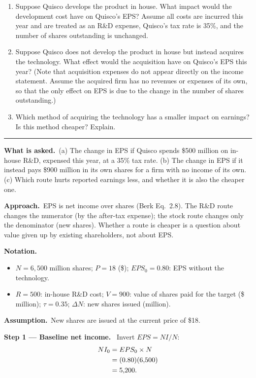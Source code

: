 \documentclass[11pt,a4paper]{article}
\newcommand{\notation}{\par\noindent\textbf{Notation.}}
\newcommand{\step}[2]{\par\medskip\noindent\textbf{Step #1 --- #2.}~}
\newcommand{\assume}{\par\smallskip\noindent\textbf{Assumption.}~}
\newcommand{\asked}{\par\medskip\noindent\textbf{What is asked.}~}
\newcommand{\approach}{\par\smallskip\noindent\textbf{Approach.}~}
\newcommand{\stmtend}{\par\endgroup\nopagebreak\noindent\rule{\linewidth}{0.4pt}\par\medskip}
\begin{document}
\begin{enumerate}
\def\labelenumi{\alph{enumi}.}
\item
  Suppose Quisco develops the product in house. What impact would the development cost have on
  Quisco's EPS? Assume all costs are incurred this year and are treated as an R\&D expense, Quisco's
  tax rate is 35\%, and the number of shares outstanding is unchanged.
\item
  Suppose Quisco does not develop the product in house but instead acquires the technology. What
  effect would the acquisition have on Quisco's EPS this year? (Note that acquisition expenses do
  not appear directly on the income statement. Assume the acquired firm has no revenues or expenses
  of its own, so that the only effect on EPS is due to the change in the number of shares
  outstanding.)
\item
  Which method of acquiring the technology has a smaller impact on earnings? Is this method cheaper?
  Explain.
\end{enumerate}
\stmtend

\asked (a) The change in EPS if Quisco spends \$500 million on in-house R\&D, expensed this year,
at a 35\% tax rate. (b) The change in EPS if it instead pays \$900 million in its own shares for a
firm with no income of its own. (c) Which route hurts reported earnings less, and whether it is
also the cheaper one.

\approach EPS is net income over shares (Berk Eq.~2.8). The R\&D route changes the numerator (by
the after-tax expense); the stock route changes only the denominator (new shares). Whether a route
is cheaper is a question about value given up by existing shareholders, not about EPS.

\notation
\begin{itemize}
  \item $N = 6{,}500$ million shares; $P = 18$ (\$); $EPS_0 = 0.80$: EPS without the technology.
  \item $R = 500$: in-house R\&D cost; $V = 900$: value of shares paid for the target (\$ million);
        $\tau = 0.35$; $\Delta N$: new shares issued (million).
\end{itemize}
\assume New shares are issued at the current price of \$18.

\step{1}{Baseline net income}
Invert $EPS = NI/N$:
\begin{align}
  NI_0 &= EPS_0 \times N \notag\\
  &= (0.80)(6{,}500) \notag\\
  &= 5{,}200. \label{e13-ni}
\end{align}
\end{document}
